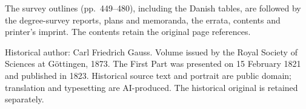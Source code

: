 The survey outlines (pp.~449--480), including the Danish tables, are followed by the degree-survey reports, plans and memoranda, the errata, contents and printer’s imprint. The contents retain the original page references.\par\medskip\noindent Historical author: Carl Friedrich Gauss. Volume issued by the Royal Society of Sciences at Göttingen, 1873. The First Part was presented on 15 February 1821 and published in 1823. Historical source text and portrait are public domain; translation and typesetting are AI-produced. The historical original is retained separately.\par\endgroup\clearpage
